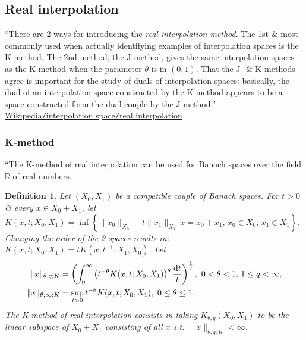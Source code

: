 \documentclass[oneside]{book}
\numberwithin{equation}{section}
\newtheorem{definition}{Definition}[chapter]
\begin{document}
\subsection{Real interpolation}
``There are 2 ways for introducing the \textit{real interpolation method}. The 1st \& most commonly used when actually identifying examples of interpolation spaces is the K-method. The 2nd method, the J-method, gives the same interpolation spaces as the K-method when the parameter $\theta$ is in $(0,1)$. That the J- \& K-methods agree is important for the study of duals of interpolation spaces: basically, the dual of an interpolation space constructed by the K-method appears to be a space constructed form the dual couple by the J-method.'' -- \href{https://en.wikipedia.org/wiki/Interpolation_space#Real_interpolation}{Wikipedia\texttt{/}interpolation space\texttt{/}real interpolation}

\subsubsection{K-method}
``The K-method of real interpolation can be used for Banach spaces over the field $\mathbb{R}$ of \href{https://en.wikipedia.org/wiki/Real_number}{real numbers}.

\begin{definition}
	Let $(X_0,X_1)$ be a compatible couple of Banach spaces. For $t > 0$ \& every $x\in X_0 + X_1$, let $K(x,t;X_0,X_1) = \inf\left\{\|x_0\|_{X_0} + t\|x_1\|_{X_1}\:x = x_0 + x_1,\,x_0\in X_0,\,x_1\in X_1\right\}$. Changing the order of the 2 spaces results in: $K(x,t;X_0,X_1) = tK(x,t^{-1};X_1,X_0)$. Let
	\begin{align*}
		\|x\|_{\theta,q;K} &= \left(\int_0^\infty \left(t^{-\theta}K(x,t;X_0,X_1)\right)^q\frac{{\rm d}t}{t}\right)^{\frac{1}{q}},\ 0 < \theta < 1,\,1\le q < \infty,\\
		\|x\|_{\theta,\infty;K} &= \sup_{t > 0} t^{-\theta}K(x,t;X_0,X_1),\ 0\le\theta\le 1.
	\end{align*}
	The K-method of real interpolation consists in taking $K_{\theta,q}(X_0,X_1)$ to be the linear subspace of $X_0 + X_1$ consisting of all $x$ s.t. $\|x\|_{\theta,q;K} < \infty$.
\end{definition}
\end{document}
